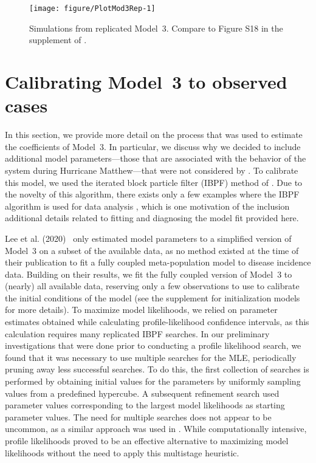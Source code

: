 \begin{figure}[!h]
\begin{knitrout}
\color{fgcolor}
\texttt{[image: figure/PlotMod3Rep-1]} 
\end{knitrout}
\caption[Simulations from replicated Model 3.]{\label{fig:mod3rep}
Simulations from replicated Model~3.
Compare to Figure S18 in the supplement of \citet{lee20}.
}
\end{figure}



\section{Calibrating Model~3 to observed cases}\label{sec:appendix_haiti_mod3Cal}












In this section, we provide more detail on the process that was used to estimate the coefficients of Model~3.
In particular, we discuss why we decided to include additional model parameters---those that are associated with the behavior of the system during Hurricane Matthew---that were not considered by \cite{lee20}.
To calibrate this model, we used the iterated block particle filter (IBPF) method of \cite{ionides24}.
Due to the novelty of this algorithm, there exists only a few examples where the IBPF algorithm is used for data analysis \cite{li23,ionides24}, which is one motivation of the inclusion additional details related to fitting and diagnosing the model fit provided here.

Lee et al. (2020)~\cite{lee20} only estimated model parameters to a simplified version of Model~3 on a subset of the available data, as no method existed at the time of their publication to fit a fully coupled meta-population model to disease incidence data.
Building on their results, we fit the fully coupled version of Model~3 to (nearly) all available data, reserving only a few observations to use to calibrate the initial conditions of the model (see the supplement for initialization models for more details).
To maximize model likelihoods, we relied on parameter estimates obtained while calculating profile-likelihood confidence intervals, as this calculation requires many replicated IBPF searches.
In our preliminary investigations that were done prior to conducting a profile likelihood search, we found that it was necessary to use multiple searches for the MLE, periodically pruning away less successful searches.
To do this, the first collection of searches is performed by obtaining initial values for the parameters by uniformly sampling values from a predefined hypercube.
A subsequent refinement search used parameter values corresponding to the largest model likelihoods as starting parameter values.
The need for multiple searches does not appear to be uncommon, as a similar approach was used in \cite{ionides24}.
While computationally intensive, profile likelihoods proved to be an effective alternative to maximizing model likelihoods without the need to apply this multistage heuristic.

